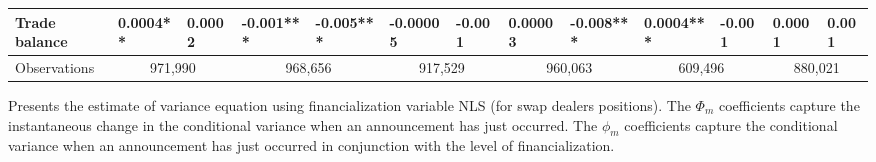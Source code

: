 \begin{landscape}
\begin{table}[]
{\begin{tabular}{lllllllllllll}
Trade balance            & 0.0004** & 0.0002   & -0.001***  & -0.005*** & -0.00005  & -0.001   & 0.00003   & -0.008*** & 0.0004*** & -0.001    & 0.0001    & 0.001     \\ \hline
Observations &
  \multicolumn{2}{c}{971,990} &
  \multicolumn{2}{c}{968,656} &
  \multicolumn{2}{c}{917,529} &
  \multicolumn{2}{c}{960,063} &
  \multicolumn{2}{c}{609,496} &
  \multicolumn{2}{c}{880,021} \\ \hline
\end{tabular}%
}
 \singlespacing
        \footnotesize
 Presents the estimate of variance equation using financialization variable NLS (for swap dealers positions). The $\Phi_m$ coefficients capture the instantaneous change in the conditional variance when an announcement has just occurred. The $\phi_m$ coefficients capture the conditional variance when an announcement has just occurred in conjunction with the level of financialization.
\end{table}
\end{landscape}
%

